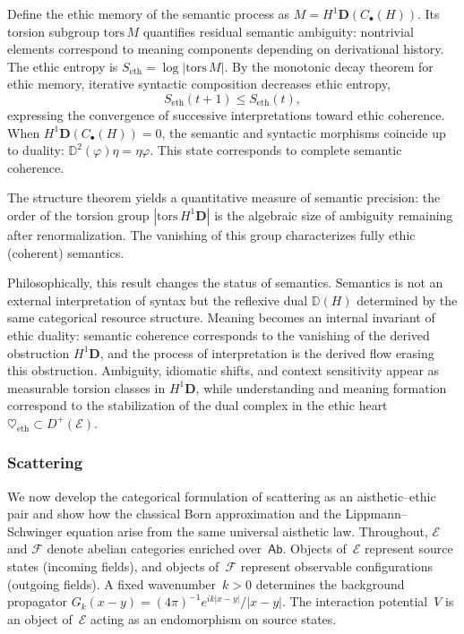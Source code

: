 \documentclass[12pt]{article}
\newcommand{\E}{\mathcal{E}}
\newcommand{\F}{\mathcal{F}}
\newcommand{\Ab}{\mathsf{Ab}}
\theoremstyle{plain}
\theoremstyle{definition}
\theoremstyle{remark}
\numberwithin{equation}{section}
\begin{document}
Define the ethic memory of the semantic process as $M=H^1\mathbf D(C_\bullet(H))$. Its torsion subgroup $\mathrm{tors}\,M$ quantifies residual semantic ambiguity: nontrivial elements correspond to meaning components depending on derivational history. The ethic entropy is $S_{\mathrm{eth}}=\log|\mathrm{tors}\,M|$. By the monotonic decay theorem for ethic memory, iterative syntactic composition decreases ethic entropy,
\begin{equation}
S_{\mathrm{eth}}(t+1)\le S_{\mathrm{eth}}(t),
\end{equation}
expressing the convergence of successive interpretations toward ethic coherence. When $H^1\mathbf D(C_\bullet(H))=0$, the semantic and syntactic morphisms coincide up to duality: $\mathbb D^2(\varphi)\eta=\eta\varphi$. This state corresponds to complete semantic coherence.

The structure theorem yields a quantitative measure of semantic precision: the order of the torsion group $|\mathrm{tors}\,H^1\mathbf D|$ is the algebraic size of ambiguity remaining after renormalization. The vanishing of this group characterizes fully ethic (coherent) semantics.

Philosophically, this result changes the status of semantics. Semantics is not an external interpretation of syntax but the reflexive dual $\mathbb D(H)$ determined by the same categorical resource structure. Meaning becomes an internal invariant of ethic duality: semantic coherence corresponds to the vanishing of the derived obstruction $H^1\mathbf D$, and the process of interpretation is the derived flow erasing this obstruction. Ambiguity, idiomatic shifts, and context sensitivity appear as measurable torsion classes in $H^1\mathbf D$, while understanding and meaning formation correspond to the stabilization of the dual complex in the ethic heart $\heartsuit_{\mathrm{eth}}\subset D^+(\E)$.

\subsubsection{Scattering}

We now develop the categorical formulation of scattering as an aisthetic–ethic pair and show how the classical Born approximation and the Lippmann--Schwinger equation arise from the same universal aisthetic law.  Throughout, $\E$ and $\F$ denote abelian categories enriched over~$\Ab$.  Objects of~$\E$ represent source states (incoming fields), and objects of~$\F$ represent observable configurations (outgoing fields).  A fixed wavenumber~$k>0$ determines the background propagator $G_k(x-y)=(4\pi)^{-1}e^{ik|x-y|}/|x-y|$.  The interaction potential~$V$ is an object of~$\E$ acting as an endomorphism on source states.  
\end{document}
